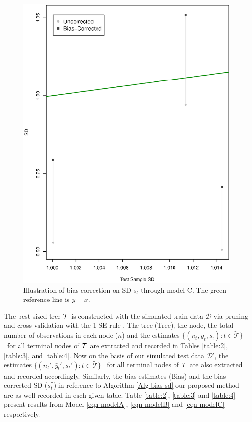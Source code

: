 \begin{figure}[H]
	\centering
	\includegraphics[scale=0.40, angle=0]{fig-SE-C+.eps}
	\caption{Illustration of bias correction on SD $s_t$ through model C. The green reference line is $y=x$. 
		\label{fig02-bias-sdC}}
\end{figure}

The best-sized tree $\mathcal{T}$ is constructed with the simulated train data $\mathcal{D}$ via pruning and cross-validation with the 1-SE rule \citep{breiman1984classification}. The tree (Tree), the node, the total number of observations in each node ($n$) and the estimates $\{(n_t, \bar{y}_t, s_t): t \in \widetilde{\mathcal{T}}\}$ \ for all terminal nodes of $\mathcal{T}$ are extracted and recorded in Tables \ref{table:2}, \ref{table:3}, and \ref{table:4}. Now on the basis of our simulated test data $\mathcal{D}'$, the estimates $\{(n_t', \bar{y}_t', s_t'): t \in \widetilde{\mathcal{T}}\}$ \ for all terminal nodes of $\mathcal{T}$ are also extracted and recorded accordingly. Similarly, the bias estimates (Bias) and the bias-corrected SD ($s_t^{''}$) in reference to Algorithm \ref{Alg-bias-sd} our proposed method are as well recorded in each given table. Table \ref{table:2}, \ref{table:3} and \ref{table:4} present results from Model \ref{eqn-modelA}, \ref{eqn-modelB} and \ref{eqn-modelC} respectively.

